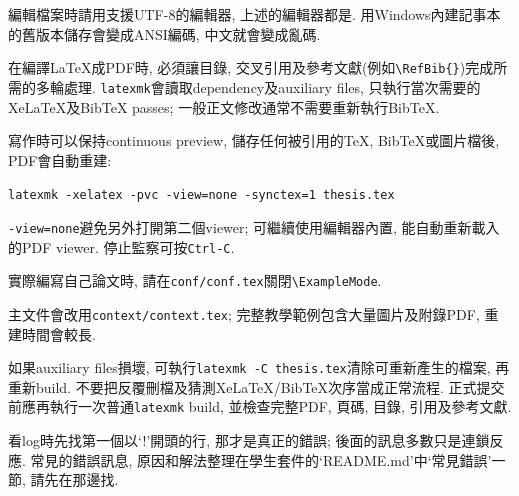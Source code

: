 編輯檔案時請用支援UTF-8的編輯器, 上述的編輯器都是. 用Windows內建記事本的舊版本儲存會變成ANSI編碼, 中文就會變成亂碼.


在編譯LaTeX成PDF時, 必須讓目錄, 交叉引用及參考文獻(例如\verb|\RefBib{}|)完成所需的多輪處理. \texttt{latexmk}會讀取dependency及auxiliary files, 只執行當次需要的XeLaTeX及BibTeX passes; 一般正文修改通常不需要重新執行BibTeX.

寫作時可以保持continuous preview, 儲存任何被引用的TeX, BibTeX或圖片檔後, PDF會自動重建:

\begin{center}
\verb|latexmk -xelatex -pvc -view=none -synctex=1 thesis.tex|
\end{center}

\verb|-view=none|避免另外打開第二個viewer; 可繼續使用編輯器內置, 能自動重新載入的PDF viewer. 停止監察可按\texttt{Ctrl-C}.

實際編寫自己論文時, 請在\verb|conf/conf.tex|關閉\verb|\ExampleMode|.

主文件會改用\verb|context/context.tex|; 完整教學範例包含大量圖片及附錄PDF, 重建時間會較長.

如果auxiliary files損壞, 可執行\verb|latexmk -C thesis.tex|清除可重新產生的檔案, 再重新build. 不要把反覆刪檔及猜測XeLaTeX/BibTeX次序當成正常流程. 正式提交前應再執行一次普通\texttt{latexmk} build, 並檢查完整PDF, 頁碼, 目錄, 引用及參考文獻.


看log時先找第一個以`!'開頭的行, 那才是真正的錯誤; 後面的訊息多數只是連鎖反應. 常見的錯誤訊息, 原因和解法整理在學生套件的`README.md'中`常見錯誤'一節, 請先在那邊找.

